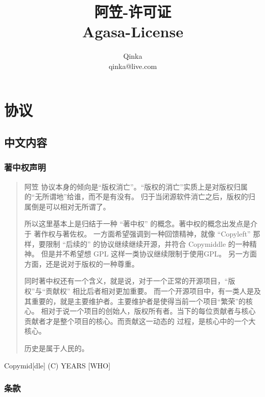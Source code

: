 \documentclass[UTF8]{book}
\author{Qinka \\ qinka@live.com}
\title{阿笠-许可证\\Agasa-License}
\begin{document}
\maketitle
\tableofcontents

\part{协议}
\chapter{中文内容}
\section{著中权声明}
\begin{quote}
    阿笠 协议本身的倾向是“版权消亡”。“版权的消亡”实质上是对版权归属的“无所谓地”给谁，而不是有没有。
    归于当闭源软件消亡之后，版权的归属倒是可以相对无所谓了。

    所以这里基本上是归结于一种 “著中权” 的概念。著中权的概念出发点是介于 著作权与著佐权。
    一方面希望强调到一种回馈精神，就像 “Copyleft” 那样，要限制 “后续的” 的协议继续继续开源，并符合 Copymiddle 的一种精神。
    但是并不希望想 GPL 这样一类协议继续限制于使用GPL。
    另一方面方面，还是说对于版权的一种尊重。

    同时著中权还有一个含义，就是说，对于一个正常的开源项目，“版权”与“贡献权” 相比后者相对更加重要。
    而一个开源项目中，有一类人是及其重要的，就是主要维护者。主要维护者是使得当前一个项目“繁荣”的核心。
    相对于说一个项目的创始人，版权所有者。当下的每位贡献者与核心贡献者才是整个项目的核心。而贡献这一动态的
    过程，是核心中的一个大核心。

    历史是属于人民的。
\end{quote}
Copymid[dle] (C) YEARS [WHO]

\section{条款}

    
\end{document}
